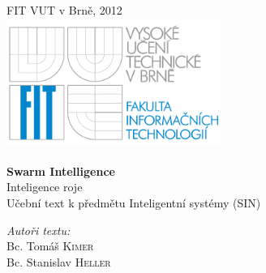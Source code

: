 
\begin{titlepage}

\begin{center}


FIT VUT v Brně, 2012\\[1.5cm]
\includegraphics[width=7cm]{./img/fit-cz.png}\\[1cm]

\HRule \\[0.4cm]
{\huge \bfseries Swarm Intelligence}\\[0.1cm]
{\LARGE Inteligence roje}
\HRule \\[0.8cm]

{\large Učební text k předmětu Inteligentní systémy (SIN)}\\[1cm]

\vfill

\end{center}

\begin{minipage}{0.4\textwidth}
\begin{flushleft} \large
\emph{Autoři textu:}\\
Bc. Tomáš \textsc{Kimer}\\
Bc. Stanislav \textsc{Heller}
\end{flushleft}
\end{minipage}

\end{titlepage}
